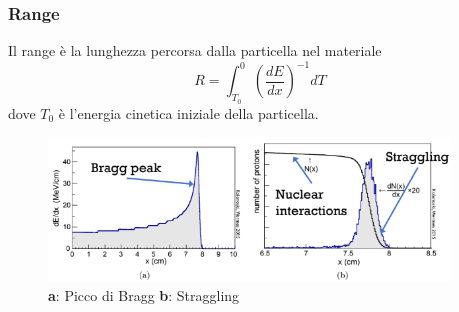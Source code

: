 \subsubsection*{Range}
Il range è la lunghezza percorsa dalla particella nel materiale \[R=\int_{T_0}^0 (\frac{dE}{dx})^{-1} dT\] dove $T_0$ è l'energia cinetica iniziale della particella.

\begin{figure}[H]
    \centering
    \includegraphics[width=0.95\textwidth,frame]{Chapters/images/Interazione_radiazione_materia/image-20220214185815482.png}
    \captionsetup{width=0.95\linewidth}
    \caption{\textbf{a}: Picco di Bragg \quad \textbf{b}: Straggling }
    \label{fig:straggling}
\end{figure}

